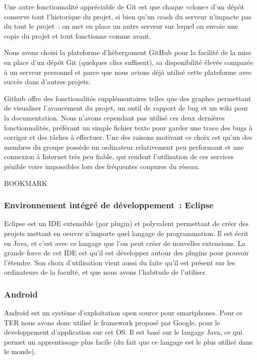 \documentclass[a4paper,11pt,french]{article}
\def\android{Android\texttrademark{}}
\begin{document}
Une autre fonctionnalité appréciable de Git est que chaque «clone» d'un dépôt conserve tout l'historique du projet, si bien qu'un crash du serveur n'impacte pas du tout le projet~: on met en place un autre serveur sur lequel on envoie une copie du projet et tout fonctionne comme avant.

Nous avons choisi la plateforme d'hébergement GitHub pour la facilité de la mise en place d'un dépôt Git (quelques clics suffisent), sa disponibilité élevée comparée à un serveur personnel et parce que nous avions déjà utilisé cette plateforme avec succès dans d'autres projets.

Github offre des fonctionalités supplémentaires telles que des graphes permettant de visualiser l'avancement du projet, un outil de rapport de bug et un wiki pour la documentation. Nous n'avons cependant pas utilisé ces deux dernières fonctionnalités, préférant un simple fichier texte pour garder une trace des bugs à corriger et des tâches à effectuer. Une des raisons motivant ce choix est qu'un des membres du groupe possède un ordinateur relativement peu performant et une connexion à Internet très peu fiable, qui rendent l'utilisation de ces services pénible voire impossibles lors des fréquentes coupures du réseau.

BOOKMARK

\subsubsection{Environnement intégré de développement~: Eclipse}
Eclipse est un IDE extensible (par plugin) et polyvalent permettant de créer des projets mettant en oeuvre n'importe quel langage de programmation. Il est écrit en Java, et c'est avec ce langage que l'on peut créer de nouvelles extensions. La grande force de cet IDE est qu'il est développer autour des plugins pour pouvoir l'étendre.
Son choix d'utilisation vient aussi du faite qu'il est présent sur les ordinateurs de la faculté, et que nous avons l'habitude de l'utiliser.

\subsubsection{\android{}}
\android{} est un système d'exploitation open source pour smartphones. Pour ce TER nous avons donc utilisé le framework proposé par Google, pour le developpement d'application sur cet OS. Il est basé sur le langage Java, ce qui permet un apprentissage plus facile (du fait que ce langage est le plus utilisé dans le monde).
\end{document}
